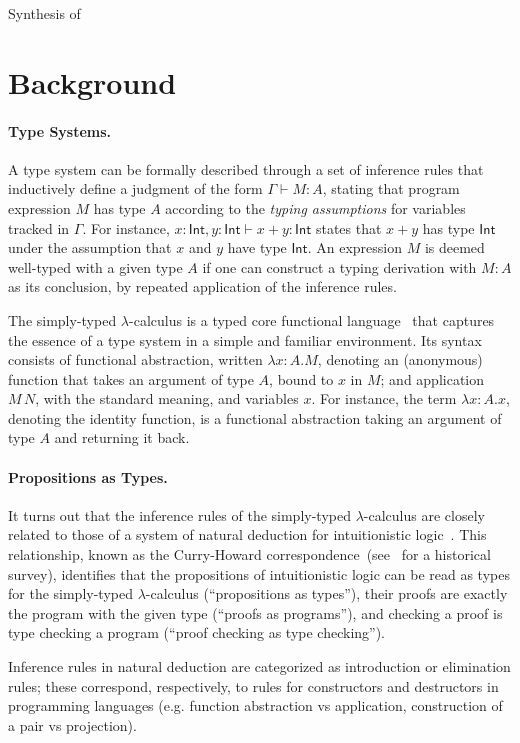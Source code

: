 \documentclass{llncs}
\newcommand{\mypara}[1]{\paragraph{\textbf{#1}.}}
\begin{document}
Synthesis of 









\appendix

\section{Background}\label{sec:background}

\mypara{Type Systems} A type system can be formally described through
a set of inference rules that inductively define a judgment of the
form $\Gamma \vdash M : A$, stating that program expression $M$ has
type $A$ according to the \emph{typing assumptions} for variables
tracked in $\Gamma$. For instance,
$x{:}\mathsf{Int}, y{:}\mathsf{Int} \vdash x+y : \mathsf{Int}$ states
that $x+y$ has type $\mathsf{Int}$ under the assumption that $x$ and
$y$ have type $\mathsf{Int}$.  An expression $M$ is deemed well-typed
with a given type $A$ if one can construct a typing derivation with $M :
A$ as its conclusion, by repeated application of the inference rules.

The simply-typed $\lambda$-calculus is a typed core functional
language~\cite{10.5555/509043} that captures the essence of a type system in a simple and familiar environment. Its syntax consists of
functional abstraction, written $\lambda x{:}A.M$, denoting
an (anonymous) function that takes an argument of type $A$, bound to
$x$ in $M$; and application $M\,N$, with the standard meaning, and
variables $x$. For instance, the term $\lambda x{:}A.x$, denoting the identity function, is a functional abstraction
taking an argument of type $A$ and returning it back.

\mypara{Propositions as Types}
%
It turns out that the inference rules of the simply-typed
$\lambda$-calculus are closely related to those of a system of natural
deduction for intuitionistic logic~\cite{prawitznd65}. This
relationship, known as the Curry-Howard
correspondence~(see~\cite{DBLP:journals/cacm/Wadler15} for a
historical survey),
identifies that the propositions of intuitionistic logic can be read
as types for the simply-typed $\lambda$-calculus (``propositions as
types''), their proofs are exactly the program with the given type
(``proofs as programs''), and checking a proof is type checking a
program (``proof checking as type checking'').

Inference rules in natural deduction are categorized as introduction
or elimination rules; these correspond, respectively, to rules for
constructors and destructors in programming languages (e.g. function
abstraction vs application, construction of a pair vs projection).
\end{document}
